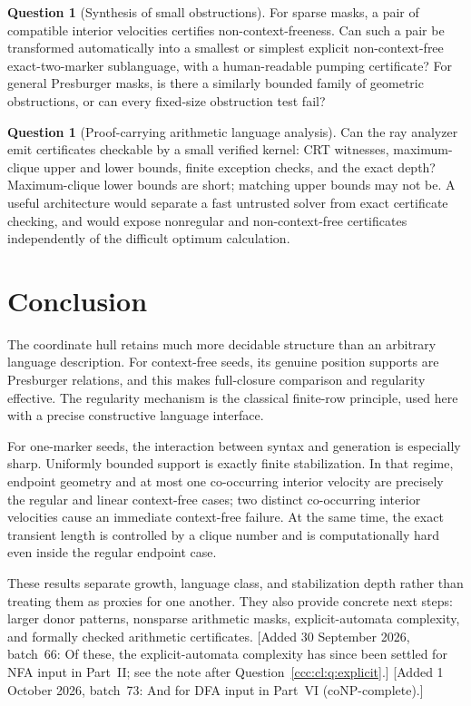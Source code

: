 \documentclass[11pt,letterpaper]{article}
\theoremstyle{definition}
\newtheorem{question}[theorem]{Question}
\theoremstyle{remark}
\newcommand{\wadd}[1]{\textup{[}Added 30 September 2026, batch~66: #1\textup{]}}
\newcommand{\waddsevthree}[1]{\textup{[}Added 1 October 2026, batch~73: #1\textup{]}}
\begin{document}
\begin{question}[Synthesis of small obstructions]\label{ccc:cl:q:obstructions}
For sparse masks, a pair of compatible interior velocities certifies
non-context-freeness. Can such a pair be transformed automatically into
a smallest or simplest explicit non-context-free exact-two-marker
sublanguage, with a human-readable pumping certificate? For general
Presburger masks, is there a similarly bounded family of geometric
obstructions, or can every fixed-size obstruction test fail?
\end{question}

\begin{question}[Proof-carrying arithmetic language analysis]\label{ccc:cl:q:certificates}
Can the ray analyzer emit certificates checkable by a small verified
kernel: CRT witnesses, maximum-clique upper and lower bounds, finite
exception checks, and the exact depth? Maximum-clique lower bounds are
short; matching upper bounds may not be. A useful architecture would
separate a fast untrusted solver from exact certificate checking, and
would expose nonregular and non-context-free certificates independently
of the difficult optimum calculation.
\end{question}

\section{Conclusion}\label{ccc:cl:sec:conclusion}

The coordinate hull retains much more decidable structure than an
arbitrary language description. For context-free seeds, its genuine
position supports are Presburger relations, and this makes full-closure
comparison and regularity effective. The regularity mechanism is the
classical finite-row principle, used here with a precise constructive
language interface.

For one-marker seeds, the interaction between syntax and generation is
especially sharp. Uniformly bounded support is exactly finite
stabilization. In that regime, endpoint geometry and at most one
co-occurring interior velocity are precisely the regular and linear
context-free cases; two distinct co-occurring interior velocities cause
an immediate context-free failure. At the same time, the exact transient
length is controlled by a clique number and is computationally hard even
inside the regular endpoint case.

These results separate growth, language class, and stabilization depth
rather than treating them as proxies for one another. They also provide
concrete next steps: larger donor patterns, nonsparse arithmetic masks,
explicit-automata complexity, and formally checked arithmetic
certificates.
\wadd{Of these, the explicit-automata complexity has since been settled for
NFA input in Part~II; see the note after
Question~\ref{ccc:cl:q:explicit}.}
\waddsevthree{And for DFA input in Part~VI (coNP-complete).}
\end{document}
